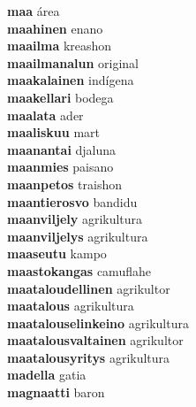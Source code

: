 \textbf{maa } área \\
\textbf{maahinen } enano \\
\textbf{maailma } kreashon \\
\textbf{maailmanalun } original \\
\textbf{maakalainen } indígena \\
\textbf{maakellari } bodega \\
\textbf{maalata } ader \\
\textbf{maaliskuu } mart \\
\textbf{maanantai } djaluna \\
\textbf{maanmies } paisano \\
\textbf{maanpetos } traishon \\
\textbf{maantierosvo } bandidu \\
\textbf{maanviljely } agrikultura \\
\textbf{maanviljelys } agrikultura \\
\textbf{maaseutu } kampo \\
\textbf{maastokangas } camuflahe \\
\textbf{maataloudellinen } agrikultor \\
\textbf{maatalous } agrikultura \\
\textbf{maatalouselinkeino } agrikultura \\
\textbf{maatalousvaltainen } agrikultor \\
\textbf{maatalousyritys } agrikultura \\
\textbf{madella } gatia \\
\textbf{magnaatti } baron \\
